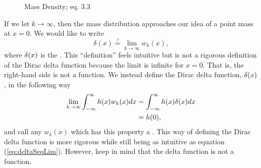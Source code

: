 \begin{figure}
    \centering
    \caption{Mass Density;  eq. 3.3}
\end{figure}

If we let \(k \rightarrow \infty\), then the mass distribution approaches our idea of a point mass at \(x=0\). We would like to write
\begin{equation} \label{eq:deltaSeqLim}
    \delta(x) \overset{?}{=} \lim_{k\rightarrow \infty} w_k(x),
\end{equation}
where \(\delta(x)\) is the . This ``definition'' feels intuitive but is not a rigorous definition of the Dirac delta function because the limit is infinite for \(x=0\). That is, the right-hand side is not a function. We instead define the Dirac delta function, \(\delta(x)\), in the following way
\begin{equation}\label{eq:seqDef}
    \begin{split}
        \lim_{k\rightarrow \infty}\int_{-\infty}^{\infty} h(x)w_k(x)dx &= \int_{-\infty}^{\infty} h(x)\delta(x)dx \\
        &= h(0),
    \end{split}
\end{equation}
and call any \(w_k(x)\) which has this property a . This way of defining the Dirac delta function is more rigorous while still being as intuitive as equation (\ref{eq:deltaSeqLim}). However, keep in mind that the delta function is not a function.

